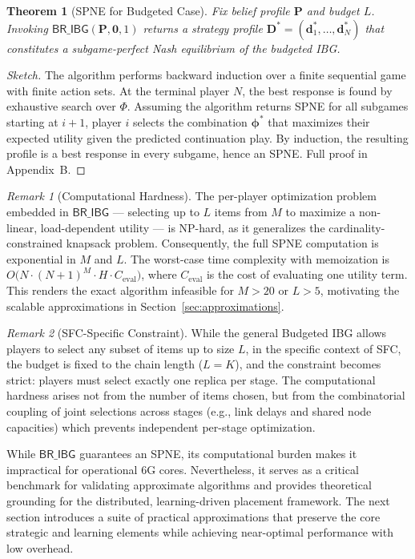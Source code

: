 \documentclass[journal]{IEEEtran}
\theoremstyle{plain}
\newtheorem{theorem}{Theorem}
\theoremstyle{definition}
\theoremstyle{remark}
\newtheorem{remark}{Remark}
\begin{document}
\begin{theorem}[SPNE for Budgeted Case]
\label{thm:br_ibg_spne}
Fix belief profile $\mathbf{P}$ and budget $L$. Invoking $\textsf{BR\_IBG}(\mathbf{P}, \mathbf{0}, 1)$ returns a strategy profile $\mathbf{D}^* = (\mathbf{d}_1^*, \dots, \mathbf{d}_N^*)$ that constitutes a subgame-perfect Nash equilibrium of the budgeted IBG.
\end{theorem}

\begin{proof}[Sketch]
The algorithm performs backward induction over a finite sequential game with finite action sets. At the terminal player $N$, the best response is found by exhaustive search over $\Phi$. Assuming the algorithm returns SPNE for all subgames starting at $i+1$, player $i$ selects the combination $\boldsymbol{\phi}^*$ that maximizes their expected utility given the predicted continuation play. By induction, the resulting profile is a best response in every subgame, hence an SPNE. Full proof in Appendix~B.
\end{proof}

\begin{remark}[Computational Hardness]
The per-player optimization problem embedded in $\textsf{BR\_IBG}$ — selecting up to $L$ items from $M$ to maximize a non-linear, load-dependent utility — is NP-hard, as it generalizes the cardinality-constrained knapsack problem. Consequently, the full SPNE computation is exponential in $M$ and $L$. The worst-case time complexity with memoization is $O\big(N \cdot (N+1)^M \cdot H \cdot C_{\text{eval}}\big)$, where $C_{\text{eval}}$ is the cost of evaluating one utility term. This renders the exact algorithm infeasible for $M > 20$ or $L > 5$, motivating the scalable approximations in Section~\ref{sec:approximations}.
\end{remark}

\begin{remark}[SFC-Specific Constraint]
While the general Budgeted IBG allows players to select any subset of items up to size $L$, in the specific context of SFC, the budget is fixed to the chain length ($L=K$), and the constraint becomes strict: players must select exactly one replica per stage. The computational hardness arises not from the number of items chosen, but from the combinatorial coupling of joint selections across stages (e.g., link delays and shared node capacities) which prevents independent per-stage optimization.
\end{remark}

While $\textsf{BR\_IBG}$ guarantees an SPNE, its computational burden makes it impractical for operational 6G cores. Nevertheless, it serves as a critical benchmark for validating approximate algorithms and provides theoretical grounding for the distributed, learning-driven placement framework. The next section introduces a suite of practical approximations that preserve the core strategic and learning elements while achieving near-optimal performance with low overhead.
\end{document}
